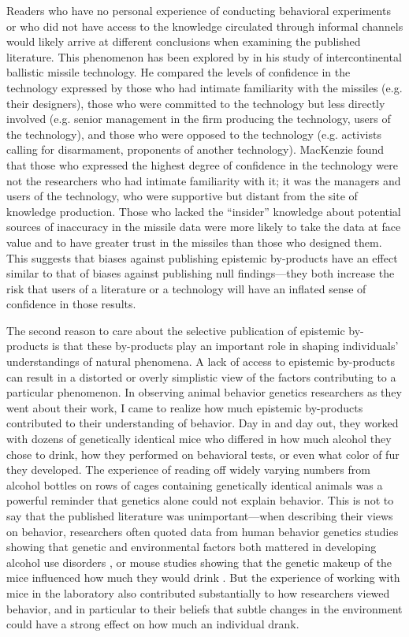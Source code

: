 \documentclass[twocolumn, serif, meta, authordate]{jote-article}
\begin{document}
Readers who have no personal experience of conducting behavioral experiments or who did not have access to the knowledge circulated through informal channels would likely arrive at different conclusions when examining the published literature. This phenomenon has been explored by \textcite{MacKenzie1998} in his study of intercontinental ballistic missile technology. He compared the levels of confidence in the technology expressed by those who had intimate familiarity with the missiles (e.g. their designers), those who were committed to the technology but less directly involved (e.g. senior management in the firm producing the technology, users of the technology), and those who were opposed to the technology (e.g. activists calling for disarmament, proponents of another technology). MacKenzie found that those who expressed the highest degree of confidence in the technology were not the researchers who had intimate familiarity with it; it was the managers and users of the technology, who were supportive but distant from the site of knowledge production. Those who lacked the ``insider''
knowledge about potential sources of inaccuracy in the missile data were more likely to take the data at face value and to have greater trust in the missiles than those who designed them. This suggests that biases against publishing epistemic by-products have an effect similar to that of biases against publishing null findings---they both increase the risk that users of a literature or a technology will have an inflated sense of confidence in those results.

The second reason to care about the selective publication of epistemic by-products is that these by-products play an important role in shaping individuals' understandings of natural phenomena. A lack of access to epistemic by-products can result in a distorted or overly simplistic view of the factors contributing to a particular phenomenon. In observing animal behavior genetics researchers as they went about their work, I came to realize how much epistemic by-products contributed to their understanding of behavior. Day in and day out, they worked with dozens of genetically identical mice who differed in how much alcohol they chose to drink, how they performed on behavioral tests, or even what color of fur they developed. The experience of reading off widely varying numbers from alcohol bottles on rows of cages containing genetically identical animals was a powerful reminder that genetics alone could not explain behavior. This is not to say that the published literature was unimportant---when describing their views on behavior, researchers often quoted data from human behavior genetics studies showing that genetic and environmental factors both mattered in developing alcohol use disorders \parencite{Prescott1999}, or mouse studies showing that the genetic makeup of the mice influenced how much they would drink \parencite{Rhodes2007}. But the experience of working with mice in the laboratory also contributed substantially to how researchers viewed behavior, and in particular to their beliefs that subtle changes in the environment could have a strong effect on how much an individual drank.
\end{document}
